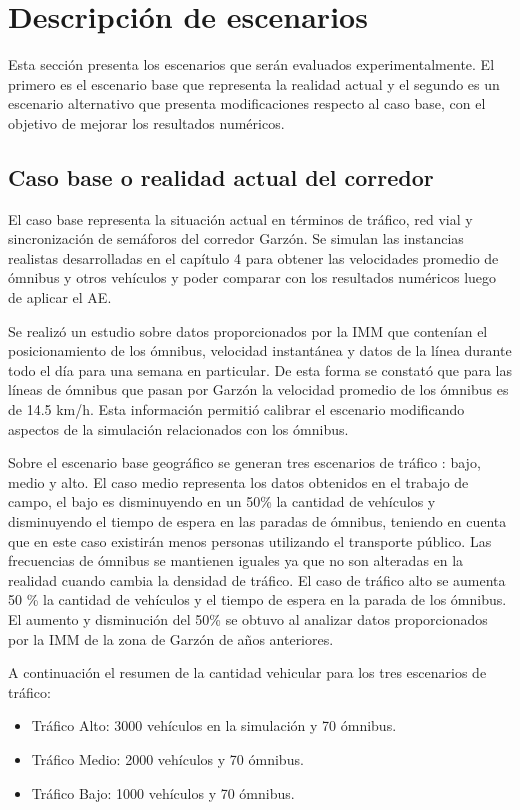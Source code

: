 \section{Descripción de escenarios}
Esta sección presenta los escenarios que serán evaluados experimentalmente. El primero es el escenario base que representa la realidad actual y el segundo es un escenario alternativo que presenta modificaciones respecto al caso base, con el objetivo de mejorar los resultados numéricos.

\subsection{Caso base o realidad actual del corredor}
El caso base representa la situación actual en términos de tráfico, red vial y sincronización de semáforos del corredor Garzón. Se simulan las instancias realistas desarrolladas en el capítulo 4 para obtener las velocidades promedio de ómnibus y otros vehículos y poder comparar con los resultados numéricos luego de aplicar el AE.  

Se realizó un estudio sobre datos proporcionados por la IMM que contenían el posicionamiento de los ómnibus, velocidad instantánea y datos de la línea durante todo el día para una semana en particular. De esta forma se constató que para las líneas de ómnibus que pasan por Garzón la velocidad promedio de los ómnibus es de 14.5 km/h. Esta información permitió calibrar el escenario modificando aspectos de la simulación relacionados con los ómnibus.

Sobre el escenario base geográfico se generan tres escenarios de tráfico : bajo, medio y alto. El caso medio representa los datos obtenidos en el trabajo de campo, el bajo es disminuyendo en un 50\% la cantidad de vehículos y disminuyendo el tiempo de espera en las paradas de ómnibus, teniendo en cuenta que en este caso existirán menos personas utilizando el transporte público. Las frecuencias de ómnibus se mantienen iguales ya que no son alteradas en la realidad cuando cambia la densidad de tráfico. El caso de tráfico alto se aumenta 50 \%  la cantidad de vehículos y el tiempo de espera en la parada de los ómnibus. El aumento y disminución del 50\% se obtuvo al analizar datos proporcionados por la IMM de la zona de Garzón de años anteriores. \newline

A continuación el resumen de la cantidad vehicular para los tres escenarios de tráfico:

\begin{itemize}
\item Tráfico Alto:  3000 vehículos en la simulación y 70 ómnibus. 
\item Tráfico Medio: 2000 vehículos y 70 ómnibus.
\item Tráfico Bajo:  1000 vehículos y 70 ómnibus.
\end{itemize}

